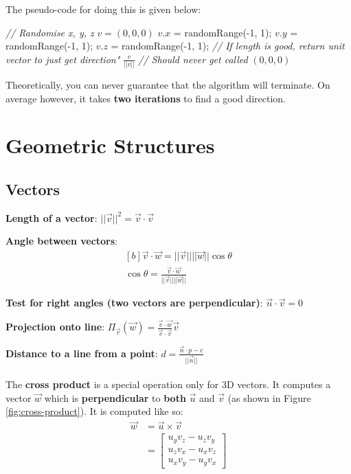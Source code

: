 \documentclass{article}
\begin{document}
The pseudo-code for doing this is given below:
\begin{algorithmic}[1]
		\STATE \textit{// Randomise x, y, z}
		\STATE $v = (0, 0, 0)$
		\STATE $v.x$ = randomRange(-1, 1);
		\STATE $v.y$ = randomRange(-1, 1);
		\STATE $v.z$ = randomRange(-1, 1);
		\STATE \textit{// If length is good, return unit vector to just get direction"}
			\RETURN $\frac{v}{||v||}		$
		\ENDIF
	\ENDWHILE
	\STATE \textit{// Should never get called}
	\RETURN $(0, 0, 0)$
\end{algorithmic}
Theoretically, you can never guarantee that the algorithm will terminate. On average however, it takes \textbf{two iterations} to find a good direction.

\section{Geometric Structures}

\subsection{Vectors}

\textbf{Length of a vector}: $||\vec{v}||^2 = \vec{v} \cdot \vec{v}$

\textbf{Angle between vectors}:
\begin{equation}
	\begin{aligned}[b]
		\vec{v} \cdot \vec{w} = ||\vec{v}|| ||\vec{w}|| \cos \theta \\
		\cos \theta = \frac{\vec{v} \cdot \vec{w}}{||\vec{v}|| ||\vec{w}||}
	\end{aligned}	
\end{equation}

\textbf{Test for right angles (two vectors are perpendicular)}: $\vec{n} \cdot \vec{v} = 0$

\textbf{Projection onto line}: $\Pi_{\vec{v}} (\vec{w}) = \frac{\vec{v} \cdot \vec{w}}{\vec{v} \cdot \vec{v}} \vec{v}$

\textbf{Distance to a line from a point}: $d = \frac{\vec{n} \cdot p - c}{||\vec{n}||}$

\paragraph{}

The \textbf{cross product} is a special operation only for 3D vectors. It computes a vector $\vec{w}$ which is \textbf{perpendicular} to \textbf{both} $\vec{u}$ and $\vec{v}$ (as shown in Figure \ref{fig:cross-product}). It is computed like so:
\begin{equation}
\begin{aligned}
	\vec{w} &= \vec{u} \times \vec{v} \\
	&= \left[ \begin{matrix}
		u_y v_z - u_z v_y \\
		u_z v_x - u_x v_z \\
		u_x v_y - u_y v_x
	\end{matrix} \right]
	\label{eq:cross-product}
\end{aligned}
\end{equation}
\end{document}
